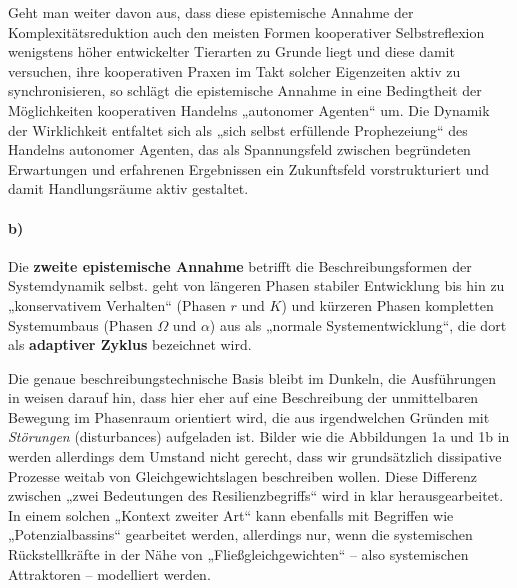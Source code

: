 \documentclass[11pt,a4paper]{article}
\begin{document}
Geht man weiter davon aus, dass diese epistemische Annahme der
Komplexitätsreduktion auch den meisten Formen kooperativer Selbstreflexion
wenigstens höher entwickelter Tierarten zu Grunde liegt und diese damit
versuchen, ihre kooperativen Praxen im Takt solcher Eigenzeiten aktiv zu
synchronisieren, so schlägt die epistemische Annahme in eine Bedingtheit der
Möglichkeiten kooperativen Handelns „autonomer Agenten“ um. Die Dynamik der
Wirklichkeit entfaltet sich als „sich selbst erfüllende Prophezeiung“ des
Handelns autonomer Agenten, das als Spannungsfeld zwischen begründeten
Erwartungen und erfahrenen Ergebnissen ein Zukunftsfeld vorstrukturiert und
damit Handlungsräume aktiv gestaltet.

\paragraph{b)}
Die \textbf{zweite epistemische Annahme} betrifft die Beschreibungsformen der
Systemdynamik selbst. \cite{Holling2000} geht von längeren Phasen stabiler
Entwicklung bis hin zu „konservativem Verhalten“ (Phasen $r$ und $K$) und
kürzeren Phasen kompletten Systemumbaus (Phasen $\Omega$ und $\alpha$) aus als
„normale Systementwicklung“, die dort als \textbf{adaptiver Zyklus} bezeichnet
wird.

Die genaue beschreibungstechnische Basis bleibt im Dunkeln, die Ausführungen
in \cite{Walker2004} weisen darauf hin, dass hier eher auf eine Beschreibung
der unmittelbaren Bewegung im Phasenraum orientiert wird, die aus
irgendwelchen Gründen mit \emph{Störungen} (disturbances) aufgeladen ist.
Bilder wie die Abbildungen 1a und 1b in \cite{Walker2004} werden allerdings
dem Umstand nicht gerecht, dass wir grundsätzlich dissipative Prozesse weitab
von Gleichgewichtslagen beschreiben wollen.  Diese Differenz zwischen „zwei
Bedeutungen des Resilienzbegriffs“ wird in \cite{Brand2007} klar
herausgearbeitet. In einem solchen „Kontext zweiter Art“ kann ebenfalls mit
Begriffen wie „Potenzialbassins“ gearbeitet werden, allerdings nur, wenn die
systemischen Rückstellkräfte in der Nähe von „Fließgleichgewichten“ -- also
systemischen Attraktoren -- modelliert werden.
\end{document}
